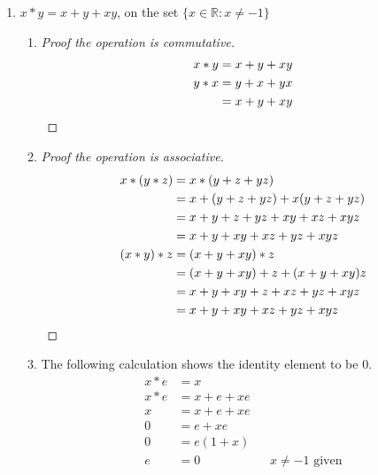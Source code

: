 \documentclass[draft,twoside]{amsart}
\newcommand{\Reals}{\mathbb{R}{}}
\begin{document}
\begin{enumerate}
\begin{enumerate}
	 \item The following calculation shows that the inverse of
	 $x$ is $4/x$.
	 \begin{align*}
	    x * x' & = 2             \\
	    x * x' & = \frac{xx'}{2} \\
	        2  & = \frac{xx'}{2} \\
		4  & = xx'           \\
		x' & = 4/x    && \text{$x \ne 0$ is given}
	 \end{align*}
      \end{enumerate}

      \item $x * y = x + y + xy$, on the set $\{x \in \Reals : x \ne -1\}$
      \begin{enumerate}
         \item
	 \begin{proof}[Proof the operation is commutative]
	    \begin{align*}
	       x * y & = x + y + xy \\
	       y * x & = y + x + yx \\
	             & = x + y + xy \qedhere
	    \end{align*}
	 \end{proof}

	 \item
	 \begin{proof}[Proof the operation is associative]
	    \begin{align*}
	       x * (y * z) & = x * (y + z + yz) \\
	                   & = x + (y + z + yz) + x(y + z + yz) \\
			   & = x + y + z + yz + xy + xz + xyz\\
			   & = x + y + xy + xz + yz + xyz \\
	       (x * y) * z & = (x + y + xy) * z \\
	                   & = (x + y + xy) + z + (x + y + xy)z \\
			   & = x + y + xy + z + xz + yz + xyz \\
			   & = x + y + xy + xz + yz + xyz \qedhere
	    \end{align*}
	 \end{proof}

	 \item The following calculation shows the identity element to
	 be 0.
	 \begin{align*}
	    x * e & = x           \\
	    x * e & = x + e + xe  \\
	        x & = x + e + xe  \\
		0 & =     e + xe  \\
		0 & =   e(1 + x)  \\
		e & = 0 && \text{$x\ne-1$ given}
	 \end{align*}


\end{enumerate}
\end{enumerate}
\end{document}
